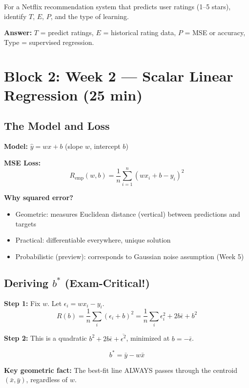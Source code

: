 \documentclass[11pt,a4paper]{article}
\begin{document}
\begin{tcolorbox}[colback=blue!5,colframe=blue!50,title=Mini-Exercise (2 min)]
For a Netflix recommendation system that predicts user ratings (1--5 stars), identify $T$, $E$, $P$, and the type of learning.
\end{tcolorbox}
\noindent\textbf{Answer:} $T$ = predict ratings, $E$ = historical rating data, $P$ = MSE or accuracy, Type = supervised regression.

\section{Block 2: Week 2 --- Scalar Linear Regression (25 min)}

\subsection{The Model and Loss}

\textbf{Model:} $\hat{y} = wx + b$ (slope $w$, intercept $b$)

\textbf{MSE Loss:}
$$R_{\text{emp}}(w, b) = \frac{1}{n}\sum_{i=1}^n (wx_i + b - y_i)^2$$

\textbf{Why squared error?}
\begin{itemize}
    \item Geometric: measures Euclidean distance (vertical) between predictions and targets
    \item Practical: differentiable everywhere, unique solution
    \item Probabilistic (preview): corresponds to Gaussian noise assumption (Week 5)
\end{itemize}

\subsection{Deriving $b^*$ (Exam-Critical!)}

\textbf{Step 1:} Fix $w$. Let $\epsilon_i = wx_i - y_i$.
$$R(b) = \frac{1}{n}\sum_i (\epsilon_i + b)^2 = \frac{1}{n}\sum_i \epsilon_i^2 + 2b\bar{\epsilon} + b^2$$

\textbf{Step 2:} This is a quadratic $b^2 + 2b\bar{\epsilon} + \overline{\epsilon^2}$, minimized at $b = -\bar{\epsilon}$.

$$\boxed{b^* = \bar{y} - w\bar{x}}$$

\textbf{Key geometric fact:} The best-fit line ALWAYS passes through the centroid $(\bar{x}, \bar{y})$, regardless of $w$.
\end{document}
